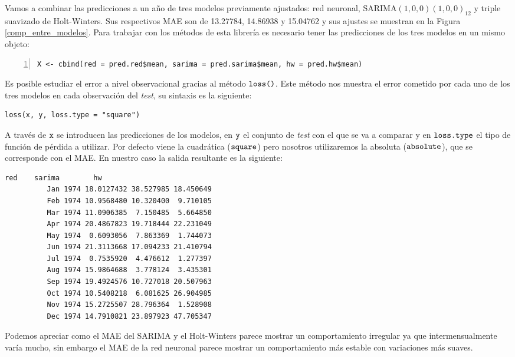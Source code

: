 Vamos a combinar las predicciones a un año de tres modelos previamente ajustados: red neuronal, SARIMA$(1,0,0)(1,0,0)_{12}$ y triple suavizado de Holt-Winters. Sus respectivos MAE son de 13.27784, 14.86938 y 15.04762 y sus ajustes se muestran en la Figura \ref{comp_entre_modelos}. Para trabajar con los métodos de esta librería es necesario tener las predicciones de los tres modelos en un mismo objeto:
\begin{Verbatim}[fontsize=\footnotesize, numbers = left]
X <- cbind(red = pred.red$mean, sarima = pred.sarima$mean, hw = pred.hw$mean)
\end{Verbatim}

Es posible estudiar el error a nivel observacional gracias al método $\verb!loss()!$. Este método nos muestra el error cometido por cada uno de los tres modelos en cada observación del \textit{test}, su sintaxis es la siguiente:
\begin{Verbatim}[fontsize=\footnotesize]
loss(x, y, loss.type = "square")
\end{Verbatim}

A través de $\verb!x!$ se introducen las predicciones de los modelos, en $\verb!y!$ el conjunto de \textit{test} con el que se va a comparar y en $\verb!loss.type!$ el tipo de función de pérdida a utilizar.  Por defecto viene la cuadrática ($\verb!square!$) pero nosotros utilizaremos la absoluta ($\verb!absolute!$), que se corresponde con el MAE. En nuestro caso la salida resultante es la siguiente:
\begin{Verbatim}[fontsize=\footnotesize]
                          red    sarima        hw
          Jan 1974 18.0127432 38.527985 18.450649
          Feb 1974 10.9568480 10.320400  9.710105
          Mar 1974 11.0906385  7.150485  5.664850
          Apr 1974 20.4867823 19.718444 22.231049
          May 1974  0.6093056  7.863369  1.744073
          Jun 1974 21.3113668 17.094233 21.410794
          Jul 1974  0.7535920  4.476612  1.277397
          Aug 1974 15.9864688  3.778124  3.435301
          Sep 1974 19.4924576 10.727018 20.507963
          Oct 1974 10.5408218  6.081625 26.904985
          Nov 1974 15.2725507 28.796364  1.528908
          Dec 1974 14.7910821 23.897923 47.705347
\end{Verbatim}

Podemos apreciar como el MAE del SARIMA y el Holt-Winters parece mostrar un comportamiento irregular ya que intermensualmente varía mucho, sin embargo el MAE de la red neuronal parece mostrar un comportamiento más estable con variaciones más suaves.


